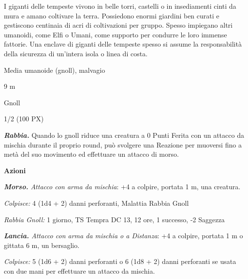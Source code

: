 \begin{multicols}{2}
{I giganti delle tempeste vivono in belle torri, castelli o in insediamenti cinti da mura e amano coltivare la terra. Possiedono enormi giardini ben curati e gestiscono centinaia di acri di coltivazioni per gruppo. Spesso impiegano altri umanoidi, come Elfi o Umani, come supporto per condurre le loro immense fattorie. Una enclave di giganti delle tempeste spesso si assume la responsabilità della sicurezza di un'intera isola o linea di costa.

\begin{description}[noitemsep, topsep=0pt, parsep=0pt, partopsep=0pt, itemsep=1pt, leftmargin=2.35cm,  labelwidth=2.2cm, itemindent=0cm, listparindent=0pt] %
\setlength{\baselineskip}{10pt}
\item[\textbf{Taglia/Tipo}] Media umanoide (gnoll), malvagio
\item[\textbf{Caratt.}] 
\item[\textbf{Punti Ferita}] 
\item[\textbf{Movimento}] 9 m
\item[\textbf{Tiri Salvez.}] 
\item[\textbf{Sensi}] 
\item[\textbf{Linguaggi}] Gnoll
\item[\textbf{Sfida}] 1/2 (100 PX)
\end{description}
\smallskip

\emph{\textbf{Rabbia.}} Quando lo gnoll riduce una creatura a 0 Punti Ferita con un attacco da mischia durante il proprio round, può svolgere una Reazione per muoversi fino a metà del suo movimento ed effettuare un attacco di morso.

\textbf{Azioni}

\emph{\textbf{Morso.} Attacco con arma da mischia}: +4 a colpire, portata 1 m, una creatura.

\emph{Colpisce:} 4 (1d4 + 2) danni perforanti, Malattia Rabbia Gnoll

\emph{Rabbia Gnoll:} 1 giorno, TS Tempra DC 13, 12 ore, 1 successo, -2 Saggezza

\emph{\textbf{Lancia.} Attacco con arma da mischia o a Distanza}: +4 a colpire, portata 1 m o gittata 6 m, un bersaglio.

\emph{Colpisce:} 5 (1d6 + 2) danni perforanti o 6 (1d8 + 2) danni perforanti se usata con due mani per effettuare un attacco da mischia.

}
\end{multicols}
